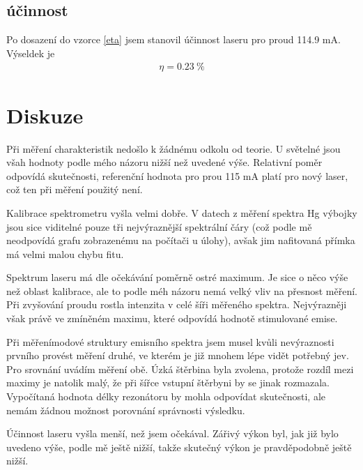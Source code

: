 \documentclass[a4paper,12pt]{article}
\begin{document}
\subsection{účinnost}
Po dosazení do vzorce \ref{eta} jsem stanovil účinnost laseru pro proud 114.9 mA. Výseldek je
\begin{eqnarray}
\eta = 0.23\ \%
\end{eqnarray}

\section{Diskuze}
Při měření charakteristik nedošlo k žádnému odkolu od teorie. U světelné jsou všah hodnoty podle mého názoru nižší než uvedené výše. Relativní poměr odpovídá skutečnosti, referenční hodnota pro prou 115 mA platí pro nový laser, což ten při měření použitý není.

Kalibrace spektrometru vyšla velmi dobře. V datech z měření spektra Hg výbojky jsou sice viditelné pouze tři nejvýraznější spektrální čáry (což podle mě neodpovídá grafu zobrazenému na počítači u úlohy), avšak jim nafitovaná přímka má velmi malou chybu fitu.

Spektrum laseru má dle očekávání poměrně ostré maximum. Je sice o něco výše než oblast kalibrace, ale to podle méh názoru nemá velký vliv na přesnost měření. Při zvyšování proudu rostla intenzita v celé šíři měřeného spektra. Nejvýrazněji však právě ve zmíněném maximu, které odpovídá hodnotě stimulované emise.

Při měřenímodové struktury emisního spektra jsem musel kvůli nevýraznosti prvního provést měření druhé, ve kterém je již mnohem lépe vidět potřebný jev. Pro srovnání uvádím měření obě. Úzká štěrbina byla zvolena, protože rozdíl mezi maximy je natolik malý, že při šířce vstupní štěrbyni by se jinak rozmazala. Vypočítaná hodnota délky rezonátoru by mohla odpovídat skutečnosti, ale nemám žádnou možnost porovnání správnosti výsledku.

Účinnost laseru vyšla menší, než jsem očekával. Zářivý výkon byl, jak již bylo uvedeno výše, podle mě ještě nižší, takže skutečný výkon je pravděpodobně ještě nižší.
\end{document}

